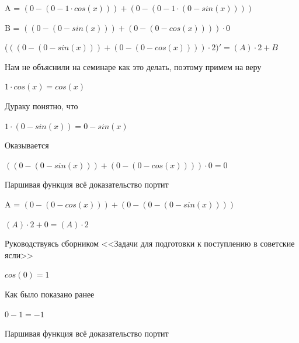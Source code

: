 \documentclass[12pt,a4paper,fleqn]{article}
\begin{document}
\begin{center}
\begin{center}
\begin{center}
\begin{center}
\begin{center}
\begin{center}
\begin{center}
\begin{center}
\begin{center}
\begin{center}
\begin{center}
\begin{center}
\begin{center}
\begin{center}
\begin{center}
\begin{center}
\begin{center}
\begin{center}
\begin{center}
\begin{center}
\begin{center}
\begin{center}
\begin{center}
\begin{center}
\begin{center}
\begin{center}
\begin{center}
\begin{center}
\begin{center}
\begin{center}
\begin{center}
\begin{center}
\begin{center}
\begin{center}
\begin{center}
A = $(0-(0-1 \cdot cos(x)))+(0-(0-1 \cdot (0-sin(x))))$\end{center}
\begin{center}
B = $((0-(0-sin(x)))+(0-(0-cos(x)))) \cdot 0$\end{center}
\begin{center}
 ($((0-(0-sin(x)))+(0-(0-cos(x)))) \cdot 2)'
  = (A) \cdot 2+B$\end{center}
Нам не объяснили на семинаре как это делать, поэтому примем на веру

\begin{center}
$1 \cdot cos(x) = cos(x)$\end{center}
Дураку понятно, что

\begin{center}
$1 \cdot (0-sin(x)) = 0-sin(x)$\end{center}
Оказывается

\begin{center}
$((0-(0-sin(x)))+(0-(0-cos(x)))) \cdot 0 = 0$\end{center}
Паршивая функция всё доказательство портит\cite{link2}

\begin{center}
A = $(0-(0-cos(x)))+(0-(0-(0-sin(x))))$\end{center}
\begin{center}
$(A) \cdot 2+0 = (A) \cdot 2$\end{center}
Руководствуясь сборником <<Задачи для подготовки к поступлению в советские ясли>>\cite{link1}

\begin{center}
\begin{center}$cos(0) = 1$\end{center}
Как было показано ранее

\begin{center}
\begin{center}$0-1 = -1$\end{center}
Паршивая функция всё доказательство портит\cite{link2}


\end{center}
\end{center}
\end{center}
\end{center}
\end{center}
\end{center}
\end{center}
\end{center}
\end{center}
\end{center}
\end{center}
\end{center}
\end{center}
\end{center}
\end{center}
\end{center}
\end{center}
\end{center}
\end{center}
\end{center}
\end{center}
\end{center}
\end{center}
\end{center}
\end{center}
\end{center}
\end{center}
\end{center}
\end{center}
\end{center}
\end{center}
\end{center}
\end{center}
\end{center}
\end{center}
\end{center}
\end{document}
